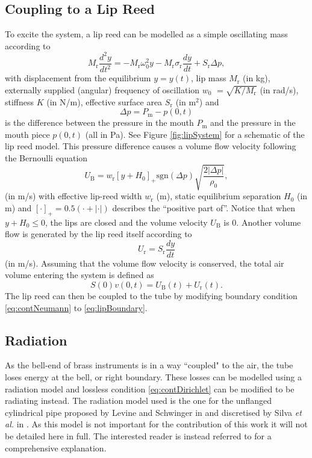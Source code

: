 \subsection{Coupling to a Lip Reed}
To excite the system, a lip reed can be modelled as a simple oscillating mass according to
\begin{equation}\label{eq:lipReedCont}
    M_\text{r}\frac{d^2y}{dt^2} = -M_\text{r}\omega_0^2 y - M_\text{r} \sigma_\text{r} \frac{dy}{dt} + S_\text{r}\Delta p,
\end{equation}
with displacement from the equilibrium $y = y(t)$, lip mass $M_\text{r}$ (in kg), externally supplied (angular) frequency of oscillation $w_0$ \SWcomment[$= w_0(t)$] $= \sqrt{K/M_\text{r}}$ (in rad/s), stiffness $K$ \SWcomment[$= K(t)$] (in N/m), effective surface area $S_\text{r}$ (in m$^2$) and 
\begin{equation}
    \Delta p = P_\text{m} - p(0,t)
\end{equation}
is the difference between the pressure in the mouth $P_\text{m}$ and the pressure in the mouth piece $p(0, t)$ (all in Pa). See Figure \ref{fig:lipSystem} for a schematic of the lip reed model. 
This pressure difference causes a volume flow velocity following the Bernoulli equation
\begin{equation}
    U_\text{B} = w_\text{r}[y + H_0]_+\text{sgn}(\Delta p) \sqrt{\frac{2|\Delta p|}{\rho_0}},
\end{equation}
(in m/s) with effective lip-reed width $w_\text{r}$ (m), static equilibrium separation $H_0$ (in m) and $[\cdot]_+ = 0.5 (\cdot + |\cdot|)$ describes the ``positive part of''. Notice that when $y + H_0 \leq 0$, the lips are closed and the volume velocity $U_\text{B}$ is 0. Another volume flow is generated by the lip reed itself according to
\begin{equation}
    U_\text{r} = S_\text{r} \frac{dy}{dt}
\end{equation}
(in m/s).
Assuming that the volume flow velocity is conserved, the total air volume entering the system is defined as
\begin{equation}\label{eq:lipBoundary}
    S(0)v(0,t) = U_\text{B}(t) + U_\text{r}(t).
\end{equation}
The lip reed can then be coupled to the tube by modifying boundary condition \eqref{eq:contNeumann} to \eqref{eq:lipBoundary}.



\subsection{Radiation}
As the bell-end of brass instruments is in a way ``coupled" to the air, the tube loses energy at the bell, or right boundary. These losses can be modelled using a radiation model and lossless condition \eqref{eq:contDirichlet} can be modified to be radiating instead. The radiation model used is the one for the unflanged cylindrical pipe proposed by Levine and Schwinger in \cite{Levine1948} and discretised by Silva \emph{et al.} in \cite{Silva2009}. As this model is not important for the contribution of this work it will not be detailed here in full. The interested reader is instead referred to \cite{Harrison2018} for a comprehensive explanation. 